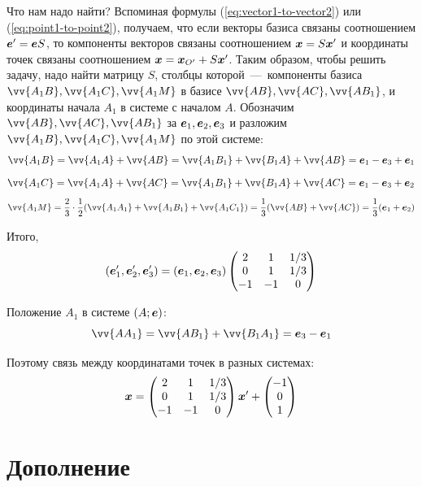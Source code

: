 \documentclass[a4paper,12pt]{article}
\begin{document}
  \begin{solution}
    Что нам надо найти?
    Вспоминая формулы (\ref{eq:vector1-to-vector2}) или (\ref{eq:point1-to-point2}), получаем, что если векторы базиса связаны соотношением $\bds e' \hm= \bds e S$, то компоненты векторов связаны соотношением $\bds x \hm= S \bds x'$ и координаты точек связаны соотношением $\bds x \hm= \bds x_{O'} \hm+ S \bds x'$.
    Таким образом, чтобы решить задачу, надо найти матрицу $S$, столбцы которой~---~компоненты базиса $\vv{A_1 B}, \vv{A_1 C}, \vv{A_1 M}$ в базисе $\vv{AB}, \vv{AC}, \vv{AB_1}$, и координаты начала $A_1$ в системе с началом $A$.
    Обозначим $\vv{AB}, \vv{AC}, \vv{AB_1}$ за $\boldsymbol e_1, \boldsymbol e_2, \boldsymbol e_3$ и разложим $\vv{A_1 B}, \vv{A_1 C}, \vv{A_1 M}$ по этой системе:
    \[
      \vv{A_1 B} = \vv{A_1 A} + \vv{AB} = \vv{A_1 B_1} + \vv{B_1 A} + \vv{AB} = \bds e_1 - \bds e_3 + \bds e_1
    \]
    \[
      \vv{A_1 C} = \vv{A_1 A} + \vv{AC} = \vv{A_1 B_1} + \vv{B_1 A} + \vv{AC} = \bds e_1 - \bds e_3 + \bds e_2
    \]
    \[
      \vv{A_1 M} = \frac{2}{3} \cdot \frac{1}{2} (\vv{A_1 A_1} + \vv{A_1 B_1} + \vv{A_1 C_1}) = \frac{1}{3} (\vv{AB} + \vv{AC})
        = \frac{1}{3} (\bds e_1 + \bds e_2)
    \]
    
    Итого,
    \[
      (\boldsymbol e_1', \boldsymbol e_2', \boldsymbol e_3') = (\boldsymbol e_1, \boldsymbol e_2, \boldsymbol e_3) \begin{pmatrix}
        2 & 1 & 1/3\\
        0 & 1 & 1/3\\
        -1 & -1 & 0
      \end{pmatrix}
    \]
    
    Положение $A_1$ в системе $(A; \boldsymbol e)$:
    \[
      \vv{AA_1} = \vv{AB_1} + \vv{B_1 A_1} = \bds e_3 - \bds e_1
    \]
    
    Поэтому связь между координатами точек в разных системах:
    \[
      \boldsymbol x = \begin{pmatrix}
        2 & 1 & 1/3\\
        0 & 1 & 1/3\\
        -1 & -1 & 0
      \end{pmatrix} \boldsymbol x'
      + \begin{pmatrix}
        -1\\
        0\\
        1
      \end{pmatrix}
    \]
  \end{solution}
  

  
  \section{Дополнение}
  
\end{document}
